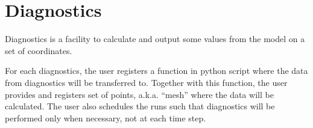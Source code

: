 
\chapter{Diagnostics}

Diagnostics is a facility to calculate and output some values from the
model on a set of coordinates.

For each diagnostics, the user registers a function in python script
where the data from diagnostics will be transferred to. Together with
this function, the user provides and registers set of points,
a.k.a. ``mesh'' where the data will be calculated. The user also
schedules the runs such that diagnostics will be performed only when
necessary, not at each time step.
